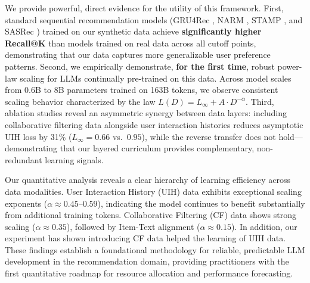 \documentclass[]{fairmeta}
\begin{document}
We provide powerful, direct evidence for the utility of this framework. First, standard sequential recommendation models (GRU4Rec \cite{hidasi2016sessionbasedrecommendationsrecurrentneural}, NARM \cite{li2017neuralattentivesessionbasedrecommendation}, STAMP \cite{gao2025stampscalabletaskmodelagnostic}, and SASRec \cite{kangSelfAttentiveSequentialRecommendation2018}) trained on our synthetic data achieve \textbf{significantly higher Recall@K} than models trained on real data across all cutoff points, demonstrating that our data captures more generalizable user preference patterns. Second, we empirically demonstrate, \textbf{for the first time}, robust power-law scaling for LLMs continually pre-trained on this data. Across model scales from 0.6B to 8B parameters trained on 163B tokens, we observe consistent scaling behavior characterized by the law $L(D) = L_\infty + A \cdot D^{-\alpha}$. Third, ablation studies reveal an asymmetric synergy between data layers: including collaborative filtering data alongside user interaction histories reduces asymptotic UIH loss by 31\% ($L_\infty = 0.66$ vs.\ $0.95$), while the reverse transfer does not hold---demonstrating that our layered curriculum provides
  complementary, non-redundant learning signals.
  
  Our quantitative analysis reveals a clear hierarchy of learning efficiency across data modalities. User Interaction History (UIH) data exhibits exceptional scaling exponents ($\alpha \approx 0.45$--$0.59$), indicating the model continues to benefit substantially from additional training tokens. Collaborative Filtering (CF) data shows strong scaling ($\alpha \approx 0.35$), followed by Item-Text alignment ($\alpha \approx 0.15$). In addition, our experiment has shown introducing CF data helped the learning of UIH data. These findings establish a foundational methodology for reliable, predictable LLM development in the recommendation domain, providing practitioners with the first quantitative roadmap for resource allocation and performance forecasting.
\end{document}
